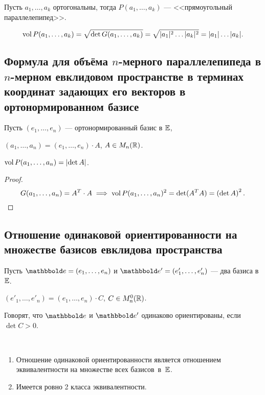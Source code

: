 \begin{example}
    Пусть $a_1, \dots, a_k$ ортогональны, тогда $P(a_1, \dots, a_k)$ --- <<прямоугольный параллелепипед>>.

    \begin{equation*}
        \operatorname{\mathop{\mathrm{vol}}} P(a_1, \dots, a_k) = \sqrt{\det G(a_1, \dots, a_k)} = \sqrt{|a_1|^2 \dots |a_k|^2} = |a_1| \dots |a_k|
    .\end{equation*}
\end{example}


\subsection{Формула для объёма $n$-мерного параллелепипеда в $n$-мерном евклидовом пространстве в терминах координат задающих его векторов в ортонормированном базисе}

Пусть $(e_1, \dots, e_n)$ --- ортонормированный базис в $\mathbb{E}$,

$(a_1, \dots, a_n) = (e_1, \dots, e_n) \cdot A$, $A \in M_n(\mathbb{R})$.

\begin{proposal}
    $\operatorname{\mathop{\mathrm{vol}}} P(a_1, \dots, a_n) = \left|\det A\right|$.
\end{proposal}

\begin{proof}
    \begin{equation*}
        G(a_1, \dots, a_n) = A^{T} \cdot A \implies \operatorname{\mathop{\mathrm{vol}}} P(a_1, \dots, a_n)^2 = \det (A^{T} A) = \left(\det A\right)^2
    .\end{equation*}
\end{proof}


\subsection{Отношение одинаковой ориентированности на множестве базисов евклидова пространства}

Пусть $\E = (e_1, \dots, e_n)$ и $\E' = (e'_1, \dots, e'_n)$ --- два базиса в $\mathbb{E}$.

$(e'_1, \dots, e'_n) = (e_1, \dots, e_n) \cdot C$, $C \in M_n^0(\mathbb{R})$.

\begin{definition}
    Говорят, что $\E$ и $\E'$ одинаково ориентированы, если $\det C > 0$.
\end{definition}

\begin{exercise}~
    \begin{enumerate}
    \item 
        Отношение одинаковой ориентированности является отношением эквивалентности на множестве всех базисов~в~$\mathbb{E}$.
    \item 
        Имеется ровно 2 класса эквивалентности.
    \end{enumerate}
\end{exercise}



